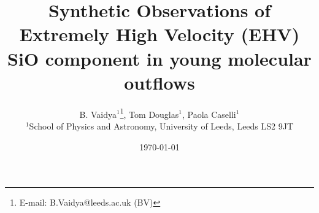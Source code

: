 \documentclass[useAMS,usenatbib]{mn2e}
\begin{document}
\title[EHV SiO component in Molecular Outflows]{Synthetic Observations of Extremely High Velocity (EHV) SiO component
  in young molecular outflows}
\author[B. Vaidya, Tom Douglas, Paola Caselli]{B. Vaidya$^{1}$\thanks{E-mail:
B.Vaidya@leeds.ac.uk (BV)}, Tom Douglas$^{1}$, Paola Caselli$^{1}$\\
$^{1}$School of Physics and Astronomy, University of Leeds, Leeds LS2
9JT\\
}

\date\today

\pagerange{\pageref{firstpage}--\pageref{lastpage}} 


\maketitle

\label{firstpage}
\end{document}
